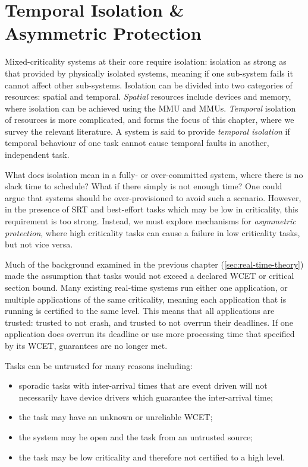 \chapter{Temporal Isolation \& \\ Asymmetric Protection}
\label{chap:scheduling}

Mixed-criticality systems at their core require isolation: isolation as strong as that provided by
physically isolated systems, meaning if one sub-system fails it cannot affect other sub-systems.  Isolation
can be divided into two categories of resources: spatial and temporal. \emph{Spatial} resources include 
devices and memory, where isolation can be achieved using the \gls{MMU} and \IO\glspl{MMU}.
\emph{Temporal} isolation of resources is more complicated, and forms the focus of this chapter, where
we survey the relevant literature.
A system is said to provide \emph{temporal isolation} if temporal behaviour of one task cannot cause
temporal faults in another, independent task. 

What does isolation mean in a fully- or over-committed system, where there is no slack time 
to schedule? What if there simply is not enough time? One could argue that systems should be
over-provisioned to avoid such a scenario.
However, in the presence of \gls{SRT} and best-effort tasks which may be low in
criticality, this requirement is too strong. Instead, we must explore mechanisms for \emph{asymmetric
protection}, where high criticality tasks can cause a failure in low criticality tasks, but not vice
versa.

Much of the background examined in the previous chapter (\cref{sec:real-time-theory})
made the assumption that tasks would not exceed a declared \gls{WCET} or critical section bound. 
Many existing real-time systems run either one application, or multiple applications of the same
criticality, meaning each application that is running is certified to the same level.  This means
that all applications are trusted: trusted to not crash, and trusted to not overrun their deadlines.
If one application does overrun its deadline or use more processing time that specified by its
\gls{WCET}, guarantees are no longer met. 

Tasks can be untrusted for many reasons including:
\begin{itemize}
    \item sporadic tasks with inter-arrival times that are event driven will not necessarily
      have device drivers which guarantee the inter-arrival time;
    \item the task may have an unknown or unreliable \gls{WCET};
    \item the system may be open and the task from an untrusted source;
    \item the task may be low criticality and therefore not certified to a high level.
\end{itemize}


